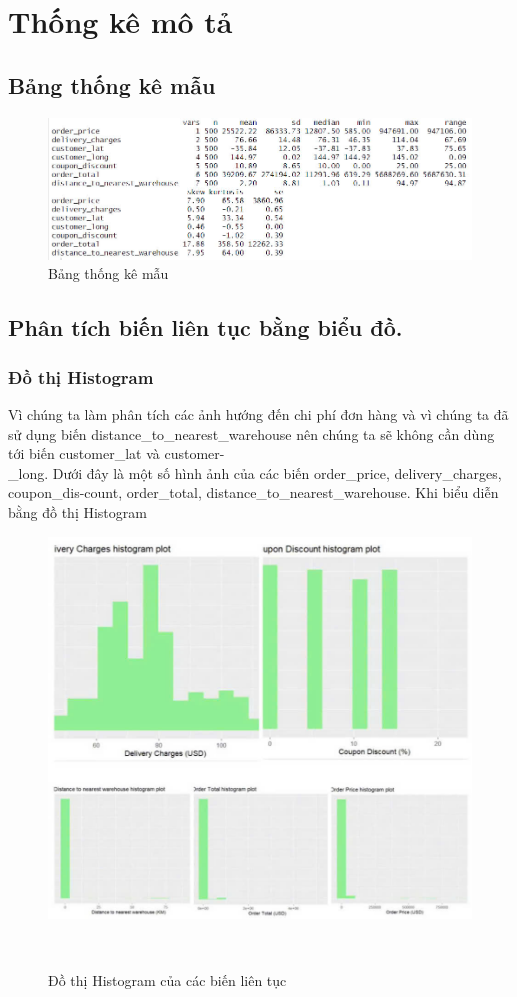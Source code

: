 \section{Thống kê mô tả}

\subsection{Bảng thống kê mẫu}
\begin{figure}[H]
    \centering
    \includegraphics[width=0.8\linewidth]{graphics/bảng thống kê mẫu.jpg}
    \caption{Bảng thống kê mẫu}
\end{figure}

\subsection{Phân tích biến liên tục bằng biểu đồ.}
\subsubsection{Đồ thị Histogram}
	Vì chúng ta làm phân tích các ảnh hướng đến chi phí đơn hàng và vì chúng ta đã sử dụng biến distance\_to\_nearest\_warehouse nên chúng ta sẽ không cần dùng tới biến customer\_lat và customer-\\\_long. Dưới đây là một số hình ảnh của các biến order\_price, delivery\_charges, coupon\_dis-count, order\_total, distance\_to\_nearest\_warehouse. Khi biểu diễn bằng đồ thị Histogram
\begin{figure}[H]
    \centering
    \includegraphics[width=0.7\linewidth]{graphics/bang7.jpg}
    \caption{Đồ thị Histogram của các biến liên tục}\
    \label{asb}
\end{figure}
\FloatBarrier

